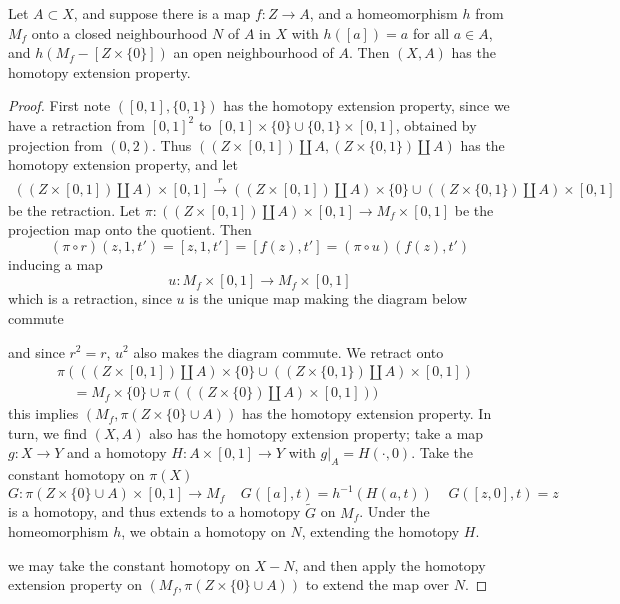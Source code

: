 \begin{lemma}
    Let $A \subset X$, and suppose there is a map $f:Z \to A$, and a homeomorphism $h$ from $M_f$ onto a closed neighbourhood $N$ of $A$ in $X$ with $h([a]) = a$ for all $a \in A$, and $h(M_f - [Z \times \{ 0 \}])$ an open neighbourhood of $A$. Then $(X,A)$ has the homotopy extension property.
\end{lemma}
\begin{proof}
    First note $([0,1], \{ 0, 1 \})$ has the homotopy extension property, since we have a retraction from $[0,1]^2$ to $[0,1] \times \{ 0 \} \cup \{ 0,1 \} \times [0,1]$, obtained by projection from $(0,2)$. Thus $((Z \times [0,1]) \coprod A, (Z \times \{ 0, 1 \}) \coprod A)$ has the homotopy extension property, and let
    \begin{align*}
        ((Z \times [0,1]) \coprod A) \times [0,1] \xrightarrow{r} ((Z \times [0,1]) \coprod A) \times \{ 0 \} \cup ((Z \times \{ 0, 1 \}) \coprod A) \times [0,1]
    \end{align*}
    be the retraction. Let $\pi: ((Z \times [0,1]) \coprod A) \times [0,1] \to M_f \times [0,1]$ be the projection map onto the quotient. Then
    \[ (\pi \circ r)(z,1,t') = [z,1,t'] = [f(z),t'] = (\pi \circ u)(f(z),t') \]
    inducing a map
    \[ u: M_f \times [0,1] \to M_f \times [0,1] \]
    which is a retraction, since $u$ is the unique map making the diagram below commute
    \begin{center}
    \end{center}
    and since $r^2 = r$, $u^2$ also makes the diagram commute. We retract onto
    \begin{align*}
        &\pi(((Z \times [0,1]) \coprod A) \times \{ 0 \} \cup ((Z \times \{ 0, 1 \}) \coprod A) \times [0,1])\\
        &\ \ \ \ \ = M_f \times \{ 0 \} \cup \pi(((Z \times \{ 0 \}) \coprod A) \times [0,1]))
    \end{align*}
    this implies $(M_f, \pi(Z \times \{ 0 \} \cup A))$ has the homotopy extension property. In turn, we find $(X,A)$ also has the homotopy extension property; take a map $g: X \to Y$ and a homotopy $H: A \times [0,1] \to Y$ with $g|_A = H(\cdot, 0)$. Take the constant homotopy on $\pi(X)$
    \[ G: \pi(Z \times \{ 0 \} \cup A) \times [0,1] \to M_f\ \ \ \ \ G([a],t) = h^{-1}(H(a, t))\ \ \ \ \ G([z,0],t) = z \]
    is a homotopy, and thus extends to a homotopy $\tilde{G}$ on $M_f$. Under the homeomorphism $h$, we obtain a homotopy on $N$, extending the homotopy $H$.


    we may take the constant homotopy on $X - N$, and then apply the homotopy extension property on $(M_f, \pi(Z \times \{ 0 \} \cup A))$ to extend the map over $N$.
\end{proof}

